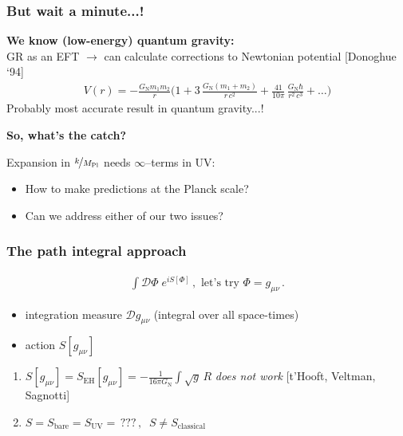 \documentclass[]{beamer}  %
\newcommand\GNewton{ G_{\scriptscriptstyle{\mathrm{N}}}{} }
\newcommand\SEH{ S_{\scriptscriptstyle{\mathrm{EH}}}{} }
\newcommand\SUV{ S_{\scriptscriptstyle{\mathrm{UV}}}{} }
\newcommand\Sbare{ S_{\scriptscriptstyle{\mathrm{bare}}}{} }
\newcommand\Sclass{ S_{\scriptscriptstyle{\mathrm{classical}}}{} }
\newcommand\MPl{ M_{\scriptscriptstyle{\mathrm{Pl}}}{} }
\newcommand\metric{ g_{\mu\nu} }
\begin{document}
\addtocounter{framenumber}{-1}
\begin{frame}
  \frametitle{But wait a minute...!}

  \vspace{18pt}
  \textbf{We know (low-energy) quantum gravity:}\\[5pt]
  GR as an EFT $\rightarrow$ can calculate corrections to Newtonian potential [Donoghue `94]
  \begin{align*}
    \boxed{
      V(r) = -\frac{\GNewton m_1 m_2}{r}
      \bigg(
        1
        + 3 \, \frac{\GNewton (m_1 + m_2)}{r \, c^2}
        + \frac{41}{10 \pi} \, \frac{\GNewton \hbar}{r^2 \, c^3}
        + \dots
      \bigg)
    }
  \end{align*}
  \hfill Probably most accurate result in quantum gravity...!
  \pause
  \vfill
  \begin{center}
    \fontsize{12pt}{7.2}\selectfont
    \textbf{ So, what's the catch? }
  \end{center}
  \pause
  \vspace{10pt}
  Expansion in $\nicefrac{k}{\MPl}$ needs $\infty$--terms in UV:\\[5pt]
  \begin{itemize}
    \item How to make predictions at the Planck scale?\\[5pt]
    \item Can we address either of our two issues?
  \end{itemize}
\end{frame}



\begin{frame}
  \frametitle{The path integral approach}

  \vspace{-18pt}

  \begin{align*}
    \boxed{
    \int \mathcal D \Phi \; e^{i S[\Phi]}\,,
    \text{ let's try } \Phi = \metric \,.
    }
  \end{align*}
  \vfill

  \begin{itemize}
    \item integration measure $\mathcal D \metric$ (integral over all space-times)
    \item action $S[\metric]$
  \end{itemize}
  \vfill
  \begin{enumerate}
    \item $S[\metric] = \SEH[\metric] = - \frac{1}{16 \pi \GNewton} \int \sqrt{g} \, R$
      \hspace{2pt}
      \textit{does not work} [t'Hooft, Veltman, Sagnotti]\\[15pt]
    \item $S = \Sbare = \SUV = \, ???\,, \;\; S \neq \Sclass$
  \end{enumerate}
\end{frame}
\end{document}

